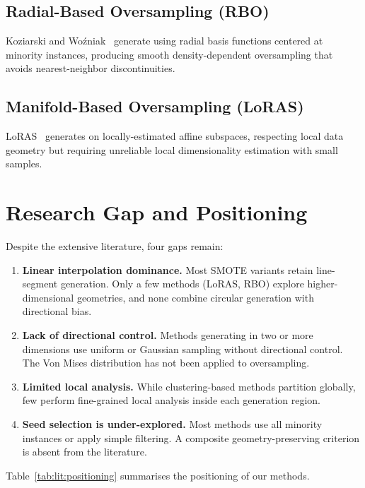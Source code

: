 \subsection{Radial-Based Oversampling (RBO)}

Koziarski and Wo{\'z}niak~\cite{koziarski2020radial} generate using radial basis functions centered at minority instances, producing smooth density-dependent oversampling that avoids nearest-neighbor discontinuities.

\subsection{Manifold-Based Oversampling (LoRAS)}

LoRAS~\cite{bej2021loras} generates on locally-estimated affine subspaces, respecting local data geometry but requiring unreliable local dimensionality estimation with small samples.


\section{Research Gap and Positioning}
\label{sec:lit:gap}

Despite the extensive literature, four gaps remain:
\begin{enumerate}[label=(\arabic*)]
  \item \textbf{Linear interpolation dominance.} Most SMOTE variants retain line-segment generation.
  Only a few methods (LoRAS, RBO) explore higher-dimensional geometries, and none combine circular generation with directional bias.
  \item \textbf{Lack of directional control.} Methods generating in two or more dimensions use uniform or Gaussian sampling without directional control.
  The Von Mises distribution has not been applied to oversampling.
  \item \textbf{Limited local analysis.} While clustering-based methods partition globally, few perform fine-grained local analysis inside each generation region.
  \item \textbf{Seed selection is under-explored.} Most methods use all minority instances or apply simple filtering.
  A composite geometry-preserving criterion is absent from the literature.
\end{enumerate}

Table~\ref{tab:lit:positioning} summarises the positioning of our methods.

